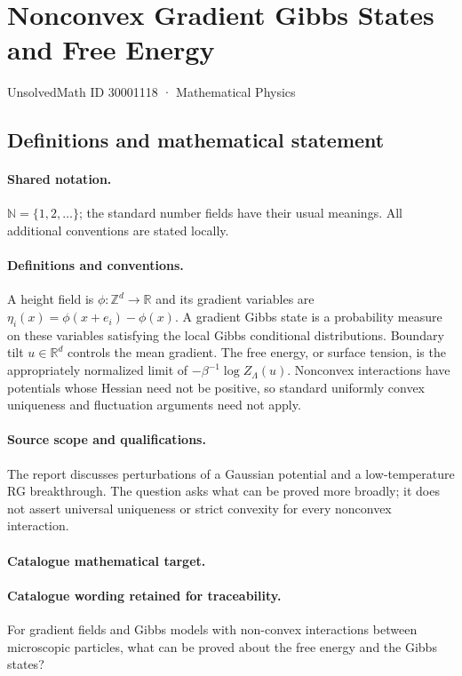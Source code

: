 \documentclass[11pt]{article}
\begin{document}
\setcounter{section}{30001117}
\section{Nonconvex Gradient Gibbs States and Free Energy}\label{30001118}
{\small UnsolvedMath ID 30001118 · Mathematical Physics}
\subsection{Definitions and mathematical statement}

\paragraph{Shared notation.}$\mathbb N=\{1,2,\ldots\}$; the standard number fields have their usual meanings. All additional conventions are stated locally.


\paragraph{Definitions and conventions.} A height field is $\phi:\mathbb Z^d\to\mathbb R$ and its gradient variables are $\eta_i(x)=\phi(x+e_i)-\phi(x)$. A gradient Gibbs state is a probability measure on these variables satisfying the local Gibbs conditional distributions. Boundary tilt $u\in\mathbb R^d$ controls the mean gradient. The free energy, or surface tension, is the appropriately normalized limit of $-\beta^{-1}\log Z_\Lambda(u)$. Nonconvex interactions have potentials whose Hessian need not be positive, so standard uniformly convex uniqueness and fluctuation arguments need not apply.

\paragraph{Source scope and qualifications.} The report discusses perturbations of a Gaussian potential and a low-temperature RG breakthrough. The question asks what can be proved more broadly; it does not assert universal uniqueness or strict convexity for every nonconvex interaction.

\paragraph{Catalogue mathematical target.}
\paragraph{Catalogue wording retained for traceability.}
For gradient fields and Gibbs models with non-convex interactions between microscopic particles, what can be proved about the free energy and the Gibbs states?
\end{document}
